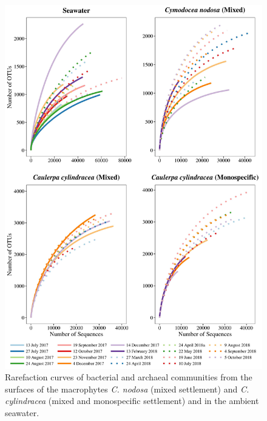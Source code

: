 \documentclass[12pt,]{article}
\begin{document}
\begin{figure}[H]

{\centering \includegraphics[width=0.85\linewidth]{../results/figures/rarefaction} 

}

\caption{Rarefaction curves of bacterial and archaeal communities from the surfaces of the macrophytes \textit{C. nodosa} (mixed settlement) and \textit{C. cylindracea} (mixed and monospecific settlement) and in the ambient seawater.\label{rarefaction}}\label{fig:unnamed-chunk-1}
\end{figure}
\end{document}
